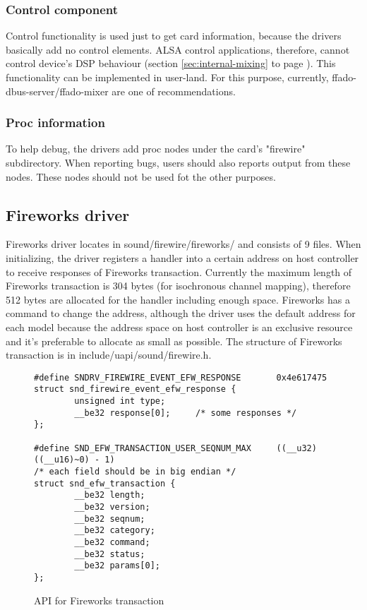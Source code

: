 \documentclass[onecolumn]{article}
\begin{document}
\subsubsection{Control component}
Control functionality is used just to get card information, because the drivers basically add no control elements. ALSA control applications, therefore, cannot control device's DSP behaviour (section \ref{sec:internal-mixing} to page \pageref{sec:internal-mixing}). This functionality can be implemented in user-land. For this purpose, currently, ffado-dbus-server/ffado-mixer are one of recommendations.

\subsubsection{Proc information}

To help debug, the drivers add proc nodes under the card's "firewire" subdirectory. When reporting bugs, users should also reports output from these nodes. These nodes should not be used fot the other purposes.


\subsection{Fireworks driver}

Fireworks driver locates in sound/firewire/fireworks/ and consists of 9 files. When initializing, the driver registers a handler into a certain address on host controller to receive responses of Fireworks transaction. Currently the maximum length of Fireworks transaction is 304 bytes (for isochronous channel mapping), therefore 512 bytes are allocated for the handler including enough space. Fireworks has a command to change the address, although the driver uses the default address for each model because the address space on host controller is an exclusive resource and it's preferable to allocate as small as possible. The structure of Fireworks transaction is in include/uapi/sound/firewire.h.

\begin{figure}[H]
\small
\begin{verbatim}
#define SNDRV_FIREWIRE_EVENT_EFW_RESPONSE       0x4e617475
struct snd_firewire_event_efw_response {
        unsigned int type;
        __be32 response[0];     /* some responses */
};

#define SND_EFW_TRANSACTION_USER_SEQNUM_MAX     ((__u32)((__u16)~0) - 1)
/* each field should be in big endian */
struct snd_efw_transaction {
        __be32 length;
        __be32 version;
        __be32 seqnum;
        __be32 category;
        __be32 command;
        __be32 status;
        __be32 params[0];
};
\end{verbatim}
\caption{API for Fireworks transaction}
\label{uapi-fireworks-transaction}
\end{figure}
\end{document}
